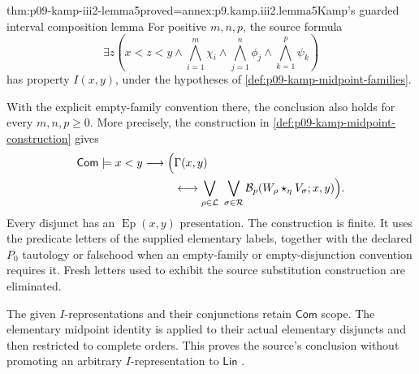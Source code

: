 \begin{hblemma}{thm:p09-kamp-iii2-lemma5}{proved=annex:p9.kamp.iii2.lemma5}{Kamp's guarded interval composition lemma}
For positive \(m,n,p\), the source formula
\[
 \exists z\left(x<z<y\land
       \bigwedge_{i=1}^{m}\chi_i\land
       \bigwedge_{j=1}^{n}\phi_j\land
       \bigwedge_{k=1}^{p}\psi_k\right)
\]
has property \(I(x,y)\), under the hypotheses of
\cref{def:p09-kamp-midpoint-families}.

With the explicit empty-family convention there, the conclusion also
holds for every \(m,n,p\geq0\). More precisely, the construction in
\cref{def:p09-kamp-midpoint-construction} gives
\[
\begin{split}
 \mathsf{Com}\models x<y\longrightarrow
 \Bigl(&\Gamma(x,y)\\
 &\longleftrightarrow
   \bigvee_{\rho\in\mathcal L}\ \bigvee_{\sigma\in\mathcal R}
      \mathcal B_p(W_\rho\mathbin{\star_\eta}V_\sigma;x,y)\Bigr).
\end{split}
\]
Every disjunct has an \(\operatorname{Ep}(x,y)\) presentation.
The construction is finite. It uses the predicate letters of the
supplied elementary labels, together with the declared \(P_0\)
tautology or falsehood when an empty-family or empty-disjunction
convention requires it. Fresh letters used to exhibit the source
substitution construction are eliminated.

The given \(I\)-representations and their conjunctions retain
\(\mathsf{Com}\) scope. The elementary midpoint identity is applied
to their actual elementary disjuncts and then restricted to complete
orders. This proves the source's conclusion without promoting an
arbitrary \(I\)-representation to \(\mathsf{Lin}\)
\cite[ch.~III, lemma~5, pp.~78--79]{Kamp1968}.
\end{hblemma}

